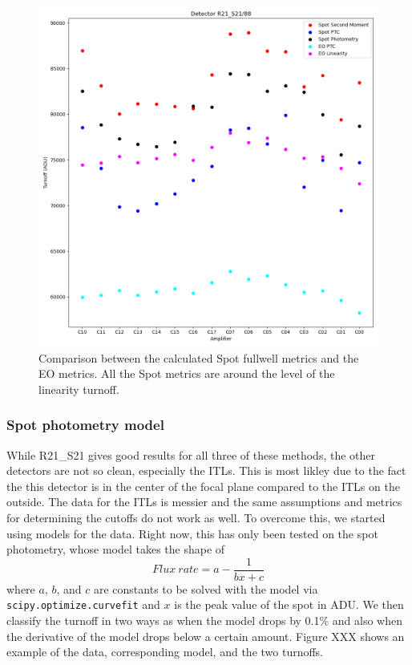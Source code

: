 \begin{figure}[ht]
    \centering
    \includegraphics[width=0.95\linewidth]{figures/Spot_EO_comparison.png}
    \caption{Comparison between the calculated Spot fullwell metrics and the EO metrics. All the Spot metrics are around the level of the linearity turnoff.}
    \label{fig:Spot_vs_EO_Metrics}
\end{figure}

\subsubsection{Spot photometry model}

While R21\_S21 gives good results for all three of these methods, the other detectors are not so clean, especially the ITLs. This is most likley due to the fact the this detector is in the center of the focal plane compared to the ITLs on the outside. 
The data for the ITLs is messier and the same assumptions and metrics for determining the cutoffs do not work as well. To overcome this, we started using models for the data. Right now, this has only been tested on the spot photometry, whose model takes the shape of
\begin{equation*}
    Flux \ rate=a-\frac{1}{bx+c}
\end{equation*}
where $a$, $b$, and $c$ are constants to be solved with the model via \texttt{scipy.optimize.curvefit} and $x$ is the peak value of the spot in ADU. We then classify the turnoff in two ways as when the model drops by 0.1\% and also when the derivative of the model drops below a certain amount. Figure XXX shows an example of the data, corresponding model, and the two turnoffs.


